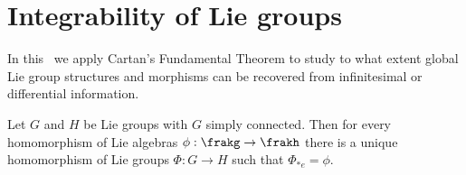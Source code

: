 \section{Integrability of Lie groups}\label{sec: existence of homs}


In this \sect\ we apply Cartan's Fundamental Theorem to study to what extent global Lie group structures and morphisms can be recovered from infinitesimal or differential information.


\begin{thm}\label{thm second principle}
    Let $G$ and $H$ be Lie groups with $G$ simply connected. Then for every homomorphism of Lie algebras $\phi:\frakg\to\frakh$ there is a unique homomorphism of Lie groups $\varPhi:G\to H$ such that $\varPhi_{\ast e}=\phi$.
\end{thm}
